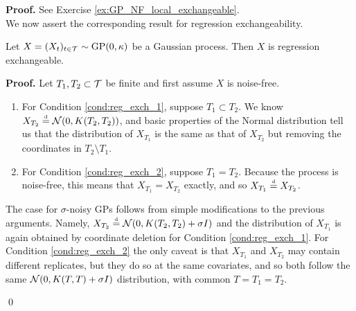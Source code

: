 \textbf{Proof. \hspace{0.05cm}} See Exercise \ref{ex:GP_NF_local_exchangeable}. \\



We now assert the corresponding result for regression exchangeability.


\begin{proposition} \label{prop:GP_reg_exch}
	Let $X = (X_t)_{t \in \mathcal{T}} \sim \mathrm{GP} (0, \kappa)$ be a Gaussian process. Then $X$ is regression exchangeable.
\end{proposition}



\textbf{Proof. \hspace{0.05cm}} Let $T_1, T_2 \subset \mathcal{T}$ be finite and first assume $X$ is noise-free.
\begin{enumerate}
	\item For Condition \ref{cond:reg_exch_1}, suppose $T_1 \subset T_2$.  We know $X_{T_2} \stackrel{\text{\rm\tiny d}}{=} \mathcal{N} (0, K(T_2, T_2))$, and basic properties of the Normal distribution tell us that the distribution of $X_{T_1}$ is the same as that of $X_{T_2}$ but removing the coordinates in $T_2 \setminus T_1$.
	\item For Condition \ref{cond:reg_exch_2}, suppose $T_1 = T_2$. Because the process is noise-free, this means that $X_{T_1} = X_{T_2}$ exactly, and so $X_{T_1} \stackrel{\text{\rm\tiny d}}{=} X_{T_2}$.
\end{enumerate}
The case for $\sigma$-noisy GPs follows from simple modifications to the previous arguments. Namely, $X_{T_2} \stackrel{\text{\rm\tiny d}}{=} \mathcal{N}( 0, K(T_2, T_2) + \sigma I)$ and the distribution of $X_{T_1}$ is again obtained by coordinate deletion for Condition \ref{cond:reg_exch_1}. For Condition \ref{cond:reg_exch_2} the only caveat is that $X_{T_1}$ and $X_{T_2}$ may contain different replicates, but they do so at the same covariates, and so both follow the same $\mathcal{N} (0, K(T, T) + \sigma I)$ distribution, with common $T = T_1 = T_2$.

\qed






